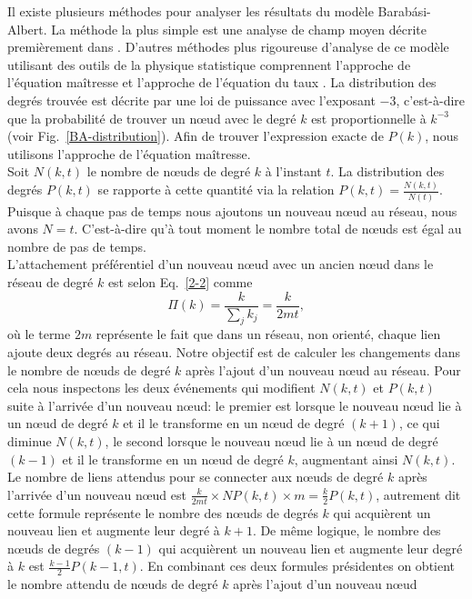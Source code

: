 Il existe plusieurs méthodes pour analyser les résultats du modèle Barabási-Albert.
La méthode la plus simple est une analyse de champ moyen décrite premièrement  dans \cite{BA1999}.
D'autres méthodes plus rigoureuse d'analyse de ce modèle utilisant des outils de la physique statistique comprennent l'approche de l'équation maîtresse \cite{Dorogovtsev-al2000-2} et l'approche de l'équation du taux \cite{Krapivsky-al2000}. La distribution des degrés trouvée est décrite par une loi de puissance avec l'exposant $-3$, c'est-à-dire que la probabilité de trouver un nœud avec le degré $k$ est proportionnelle à $k^{-3}$ (voir Fig.~\ref{BA-distribution}). Afin de trouver l'expression exacte de $P(k)$, nous utilisons l'approche de l'équation maîtresse.\\
Soit $N(k,t)$ le nombre de nœuds de degré $k$ à l'instant $t$. La distribution des degrés $P(k,t)$ se rapporte à cette quantité via la relation $P(k,t)=\frac{N(k,t)}{N(t)}$. Puisque à chaque pas de temps nous ajoutons un nouveau nœud au réseau, nous avons $N=t$. C'est-à-dire qu'à tout moment le nombre total de nœuds est égal au nombre de pas de temps.\\
L'attachement préférentiel d'un nouveau nœud avec un ancien nœud dans le réseau de degré $k$ est selon Eq.~\eqref{2-2}  comme
\begin{equation}
\Pi(k)=\frac{k}{\sum_{j}k_j}=\frac{k}{2mt},
\end{equation}
où le terme $2m$ représente le fait que dans un réseau, non orienté, chaque lien ajoute deux degrés au réseau. Notre objectif est de calculer les changements dans le nombre de nœuds de degré $k$ après l'ajout d'un nouveau nœud au réseau. Pour cela nous inspectons les deux événements qui modifient $N(k,t)$ et $P(k,t)$ suite à l'arrivée d'un nouveau nœud: le premier est lorsque le nouveau nœud lie à un nœud  de degré $k$ et il le transforme en un nœud de degré $(k+1)$, ce qui diminue $N(k,t)$, le second lorsque le nouveau nœud lie à un nœud de degré $(k-1)$ et il le transforme en un nœud de degré $k$, augmentant ainsi $N(k,t)$.\\
Le nombre de liens attendus pour se connecter aux nœuds de degré $k$ après l'arrivée d'un nouveau nœud est $\frac{k}{2mt}\times NP(k,t)\times m=\frac{k}{2}P(k,t)$, autrement dit cette formule représente le nombre des nœuds de degrés $k$ qui acquièrent un nouveau lien et augmente leur degré à $k+1$. De même logique, le nombre des nœuds de degrés $(k-1)$ qui acquièrent un nouveau lien et augmente leur degré à $k$ est $\frac{k-1}{2}P(k-1,t)$.
En combinant ces deux formules présidentes on obtient le nombre attendu de nœuds de degré $k$ après l'ajout d'un nouveau nœud
